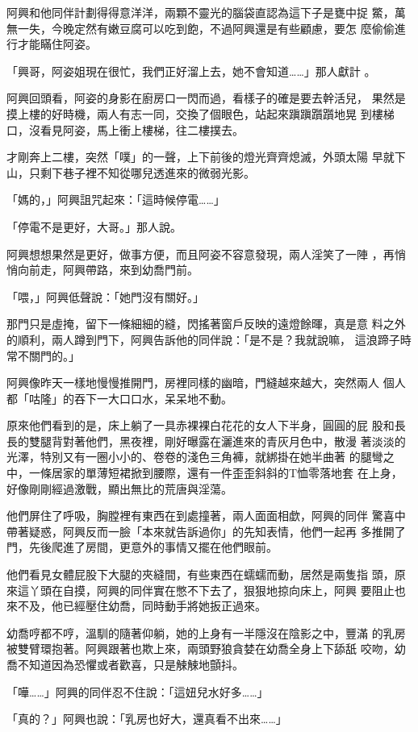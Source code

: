 阿興和他同伴計劃得得意洋洋，兩顆不靈光的腦袋直認為這下子是甕中捉
鱉，萬無一失，今晚定然有嫩豆腐可以吃到飽，不過阿興還是有些顧慮，要怎
麼偷偷進行才能瞞住阿姿。

「興哥，阿姿姐現在很忙，我們正好溜上去，她不會知道……」那人獻計
。

阿興回頭看，阿姿的身影在廚房口一閃而過，看樣子的確是要去幹活兒，
果然是摸上樓的好時機，兩人有志一同，交換了個眼色，站起來蹎蹎躓躓地晃
到樓梯口，沒看見阿姿，馬上衝上樓梯，往二樓撲去。

才剛奔上二樓，突然「噗」的一聲，上下前後的燈光齊齊熄滅，外頭太陽
早就下山，只剩下巷子裡不知從哪兒透進來的微弱光影。

「媽的，」阿興詛咒起來：「這時候停電……」

「停電不是更好，大哥。」那人說。

阿興想想果然是更好，做事方便，而且阿姿不容意發現，兩人淫笑了一陣
，再悄悄向前走，阿興帶路，來到幼喬門前。

「喂，」阿興低聲說：「她門沒有關好。」

那門只是虛掩，留下一條細細的縫，閃搖著窗戶反映的遠燈餘暉，真是意
料之外的順利，兩人蹲到門下，阿興告訴他的同伴說：「是不是？我就說嘛，
這浪蹄子時常不關門的。」

阿興像昨天一樣地慢慢推開門，房裡同樣的幽暗，門縫越來越大，突然兩人
個人都「咕隆」的吞下一大口口水，呆呆地不動。

原來他們看到的是，床上躺了一具赤裸裸白花花的女人下半身，圓圓的屁
股和長長的雙腿背對著他們，黑夜裡，剛好曝露在灑進來的青灰月色中，散漫
著淡淡的光澤，特別又有一圈小小的、卷卷的淺色三角褲，就綁掛在她半曲著
的腿彎之中，一條居家的單薄短裙掀到腰際，還有一件歪歪斜斜的T恤零落地套
在上身，好像剛剛經過激戰，顯出無比的荒唐與淫蕩。

他們屏住了呼吸，胸膛裡有東西在到處撞著，兩人面面相歔，阿興的同伴
驚喜中帶著疑惑，阿興反而一臉「本來就告訴過你」的先知表情，他們一起再
多推開了門，先後爬進了房間，更意外的事情又擺在他們眼前。

他們看見女體屁股下大腿的夾縫間，有些東西在蠕蠕而動，居然是兩隻指
頭，原來這丫頭在自摸，阿興的同伴實在憋不下去了，狠狠地掠向床上，阿興
要阻止也來不及，他已經壓住幼喬，同時動手將她扳正過來。

幼喬哼都不哼，溫馴的隨著仰躺，她的上身有一半隱沒在陰影之中，豐滿
的乳房被雙臂環抱著。阿興跟著也欺上來，兩頭野狼貪婪在幼喬全身上下舔舐
咬吻，幼喬不知道因為恐懼或者歡喜，只是觫觫地顫抖。

「嘩……」阿興的同伴忍不住說：「這妞兒水好多……」

「真的？」阿興也說：「乳房也好大，還真看不出來……」

